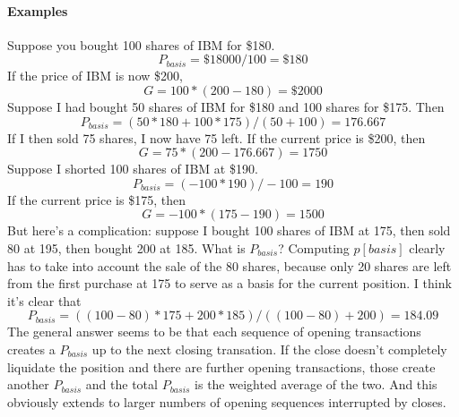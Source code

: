 \documentclass{report}
\begin{document}
\paragraph{Examples}
Suppose you bought 100 shares of IBM for \$180.
\[P_{basis}= \$18000/100 = \$180\]
If the price of IBM is now \$200,
\[G = 100 * (200-180) = \$2000\]
Suppose I had bought 50 shares of IBM for \$180 and 100 shares for \$175. Then \[P_{basis} = (50*180+100*175)/(50+100) = 176.667\]
If I then sold 75 shares, I now have 75 left. If the current price is \$200, then 
\[G = 75*(200-176.667) = 1750\]
Suppose I shorted 100 shares of IBM at \$190. 
\[P_{basis} = (-100 * 190)/-100 = 190\]
If the current price is \$175, then
\[G = -100 * (175-190) = 1500\]
But here's a complication: suppose I bought 100 shares of IBM at 175, then sold 80 at 195, then bought 200 at 185. What is $P_{basis}$?
Computing $p[basis]$ clearly has to take into account the sale of the 80 shares, because only 20 shares are left from the first purchase
at 175 to serve as a basis for the current position. I think it's clear that 
\[P_{basis} = ((100-80)*175 + 200*185)/((100-80)+200) = 184.09\]
The general answer seems to be that each sequence of opening transactions creates a $P_{basis}$ up to the next closing transation. If the close
doesn't completely liquidate the position and there are further opening transactions, those create another $P_{basis}$ and the total $P_{basis}$ is
the weighted average of the two. And this obviously extends to larger numbers of opening sequences interrupted by closes.
\end{document}
